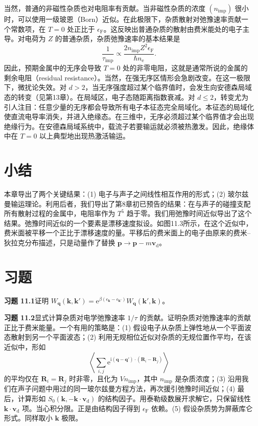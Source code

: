 当然，普通的非磁性杂质也对电阻率有贡献。当非磁性杂质的浓度 $(n_{\mathrm{imp}})$ 很小时，可以使用一级玻恩（Born）近似。在此极限下，杂质散射对弛豫速率贡献一个常数项，在 $T=0$ 处正比于 $\epsilon_{\mathrm{F}}$。这反映出普通杂质的散射由费米能处的电子主导。对电荷为 $Z$ 的普通杂质，杂质弛豫速率的基本结果是
\begin{equation*}
\frac{1}{\tau_{\mathrm{imp}}}\propto\frac{2n_{\mathrm{imp}}Z^2\epsilon_{\mathrm{F}}}{\hbar n_{\mathrm{e}}}.\tag{11.99}
\end{equation*}
因此，预期金属中的无序会导致 $T=0$ 处的非零电阻，这就是通常所说的金属的剩余电阻（residual resistance）。当然，在强无序区情形会急剧改变。在这一极限下，微扰论失效。对 $d>2$，当无序强度超过某个临界值时，会发生向安德森局域态的转变（见第13章）。在局域区，电子态随距离指数衰减。对 $d\leq 2$，转变尤为引人注目：任意少量的无序都会导致所有电子本征态完全局域化。本征态的局域化使直流电导率消失，并进入绝缘态。在三维中，无序必须超过某个临界值才会出现绝缘行为。在安德森局域系统中，载流子若要输运就必须被热激发。因此，绝缘体中在 $T=0$ 以上典型地出现热激活输运。

\section*{小结}

本章导出了两个关键结果：(1) 电子与声子之间线性相互作用的形式；(2) 玻尔兹曼输运理论。利用后者，我们导出了第8章初已预告的结果：在与声子的碰撞支配所有散射过程的金属中，电阻率作为 $T^5$ 趋于零。我们用弛豫时间近似导出了这个结果。弛豫时间近似的一个要素是漂移速度拟设。如图11.3所示，在这个近似中，费米面被平移一个正比于漂移速度的量。平移后的费米面上的电子由原来的费米–狄拉克分布描述，只是动量作了替换 $\mathbf{p}\to\mathbf{p}-m\mathbf{v}_{\mathrm{d}}$。

\section*{习题}

\textbf{习题 11.1}\quad 证明 $W_{\mathbf{q}}(\mathbf{k},\mathbf{k}')=\mathrm{e}^{\beta(\epsilon_{\mathbf{k}}-\epsilon_{\mathbf{k}'})}W_{\mathbf{q}}(\mathbf{k}',\mathbf{k})$。

\textbf{习题 11.2}\quad 显式计算杂质对电学弛豫速率 $1/\tau$ 的贡献。证明杂质对弛豫速率的贡献正比于费米能量。一个有用的策略是：(1) 假设电子从杂质上弹性地从一个平面波态散射到另一个平面波态；(2) 利用无规相位近似对杂质的无规位置作平均，在该近似中，形如
\begin{equation*}
\left\langle\sum_{i,j}\mathrm{e}^{\mathrm{i}(\mathbf{q}-\mathbf{q}')\cdot(\mathbf{R}_i-\mathbf{R}_j)}\right\rangle\tag{11.100}
\end{equation*}
的平均仅在 $\mathbf{R}_i=\mathbf{R}_j$ 时非零，且化为 $Vn_{\mathrm{imp}}$，其中 $n_{\mathrm{imp}}$ 是杂质浓度；(3) 沿用我们在声子问题中用过的同一玻尔兹曼方程方法，再次援引弛豫时间近似；(4) 最后，计算形如 $S_0(\mathbf{k},-\mathbf{k}\cdot\mathbf{v}_{\mathrm{d}})$ 的结构因子。用泰勒级数展开求解它，只保留线性 $\mathbf{k}\cdot\mathbf{v}_{\mathrm{d}}$ 项。当心积分限。正是由结构因子得到 $\epsilon_{\mathrm{F}}$ 依赖。(5) 假设杂质势为屏蔽库仑形式。同样取小 $\mathbf{k}$ 极限。

